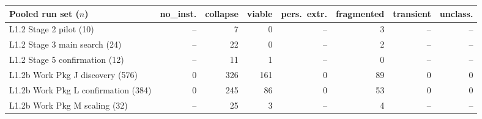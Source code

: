 \begin{tabular}{@{}lrrrrrrr@{}}
\toprule
\textbf{Pooled run set ($n$)} & \textbf{no\_inst.} & \textbf{collapse} & \textbf{viable} & \textbf{pers.\ extr.} & \textbf{fragmented} & \textbf{transient} & \textbf{unclass.} \\
\midrule
L1.2 Stage 2 pilot (10)          & --  & 7   & 0   & --  & 3  & -- & -- \\
L1.2 Stage 3 main search (24)     & --  & 22  & 0   & --  & 2  & -- & -- \\
L1.2 Stage 5 confirmation (12)    & --  & 11  & 1   & --  & 0  & -- & -- \\
L1.2b Work Pkg J discovery (576)  & 0   & 326 & 161 & 0   & 89 & 0  & 0 \\
L1.2b Work Pkg L confirmation (384) & 0 & 245 & 86  & 0   & 53 & 0  & 0 \\
L1.2b Work Pkg M scaling (32)     & --  & 25  & 3   & --  & 4  & -- & -- \\
\bottomrule
\end{tabular}
